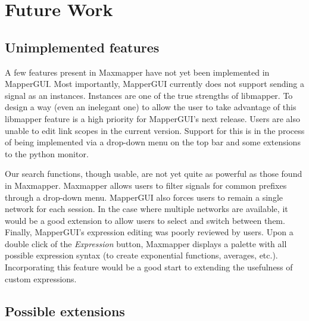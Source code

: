 \section{Future Work}
\label{sec:future_work}

	\subsection{Unimplemented features}

A few features present in Maxmapper have not yet been implemented in MapperGUI. Most importantly, MapperGUI currently does not support sending a signal as an instances. Instances are one of the true strengths of libmapper. To design a way (even an inelegant one) to allow the user to take advantage of this libmapper feature is a high priority for MapperGUI's next release. Users are also unable to edit link scopes in the current version. Support for this is in the process of being implemented via a drop-down menu on the top bar and some extensions to the python monitor. 

Our search functions, though usable, are not yet quite as powerful as those found in Maxmapper. Maxmapper allows users to filter signals for common prefixes through a drop-down menu.  MapperGUI also forces users to remain a single network for each session. In the case where multiple networks are available, it would be a good extension to allow users to select and switch between them. Finally, MapperGUI's expression editing was poorly reviewed by users. Upon a double click of the \emph{Expression} button, Maxmapper displays a palette with all possible expression syntax (to create exponential functions, averages, etc.). Incorporating this feature would be a good start to extending the usefulness of custom expressions.


	\subsection{Possible extensions} %
	\label{sub:possible_extensions}

